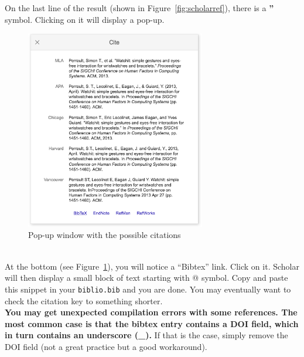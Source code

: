 On the last line of the result (shown in Figure~\ref{fig:scholarref}), there is a \textbf{''} symbol.
Clicking on it will display a pop-up.
\begin{figure}[!h]
  \centering
    \includegraphics[width=0.7\textwidth]{figures/scholarpopup.png}
  \caption{Pop-up window with the possible citations}
  \label{fig:scholarpopup}
\end{figure}
\\

At the bottom (see Figure~\ref{fig:scholarpopup}), you will notice a ``Bibtex'' link. Click on it.
Scholar will then display a small block of text starting with @ symbol.
Copy and paste this snippet in your \texttt{biblio.bib} and you are done.
You may eventually want to check the citation key to something shorter.
\\

\textbf{You may get unexpected compilation errors with some references. The most common case is that the bibtex entry contains a DOI field, which in turn contains an underscore (\_).}
If that is the case, simply remove the DOI field (not a great practice but a good workaround).
